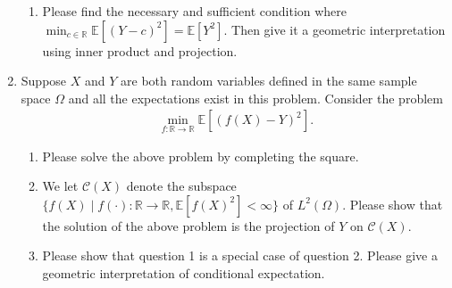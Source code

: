 \documentclass[11pt,letter,notitlepage]{article}
\begin{document}
\begin{exercise}
\begin{enumerate}
\begin{enumerate}
                \item Please find the necessary and sufficient condition where $\min_{c\in \mathbb{R}}\mathbb{E}[(Y-c)^2]=\mathbb{E}[Y^2]$. Then give it a geometric interpretation using inner product and projection.
            \end{enumerate}

            \item Suppose $X$ and $Y$ are both random variables defined in the same sample space $\Omega$ and all the expectations exist in this problem. Consider the problem
            \begin{align*}
                \min_{f:\mathbb{R}\to\mathbb{R}}\mathbb{E}[(f(X)-Y)^2].
            \end{align*}
            \begin{enumerate}
                \item Please solve the above problem by completing the square.
                \item We let $\mathcal{C}(X)$ denote the subspace $\{f(X)\mid f(\cdot):\mathbb{R}\to\mathbb{R}, \mathbb{E}[f(X)^2]<\infty \}$ of $L^2(\Omega)$. Please show that the solution of the above problem is the projection of $Y$ on $\mathcal{C}(X)$.
                \item Please show that question 1 is a special case of question 2. Please give a geometric interpretation of conditional expectation.  
            \end{enumerate}
        \end{enumerate}
    \end{exercise}	
	
\end{document}
